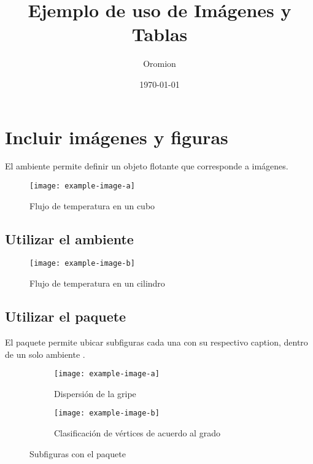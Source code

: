 \documentclass{article}
\title{Ejemplo de uso de Imágenes y Tablas}
\author{Oromion}
\date{\today}
\begin{document}
\maketitle
\renewcommand{\contentsname}{Tabla de contenido}
\renewcommand{\listfigurename}{Lista de figuras}
\renewcommand{\figurename}{Fig.}
\tableofcontents
\listoffigures

\section{Incluir imágenes y figuras}

El ambiente  permite definir un objeto flotante que corresponde a imágenes.

\begin{figure}[H]
	\centering
	\texttt{[image: example-image-a]}
	\caption{Flujo de temperatura en un cubo}
\end{figure}

\subsection{Utilizar el ambiente }

\begin{wrapfigure}[11]{R}[5mm]{.45\textwidth}
	\centering
	\caption{Flujo de temperatura en un cilindro}
	\texttt{[image: example-image-b]}
\end{wrapfigure}
\lipsum[1-2]

\subsection{Utilizar el paquete }

El paquete  permite ubicar subfiguras cada una con su respectivo caption, dentro de un solo ambiente .

\begin{figure}[H]
	\centering
	\begin{subfigure}[t]{.475\textwidth}
		\centering
		\texttt{[image: example-image-a]}
		\caption{Dispersión de la gripe}
	\end{subfigure}
	\hfill
	\begin{subfigure}[t]{.475\textwidth}
		\centering
		\texttt{[image: example-image-b]}
		\caption{Clasificación de vértices de acuerdo al grado}
	\end{subfigure}
	\caption{Subfiguras con el paquete }
\end{figure}
\end{document}
